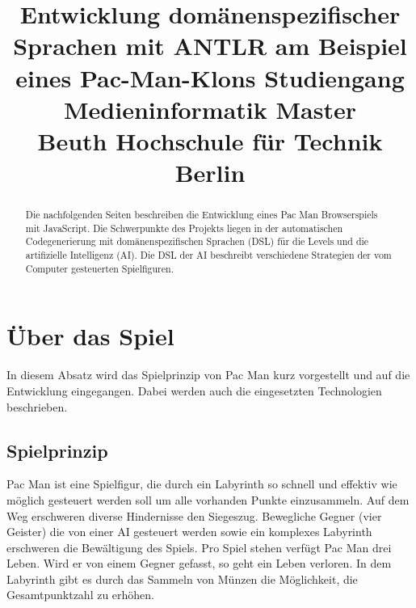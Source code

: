 \documentclass[conference]{IEEEtran}
\begin{document}
\title{%
  Entwicklung domänenspezifischer Sprachen mit ANTLR am Beispiel eines Pac-Man-Klons\bigbreak
  \large Studiengang Medieninformatik Master\\Beuth Hochschule für Technik Berlin}


\author{
\and
{}
\and
{}
}

\maketitle

\lstset{%
  basicstyle=\footnotesize\ttfamily
  }
\begin{abstract}
Die nachfolgenden Seiten beschreiben die Entwicklung eines Pac Man Browserspiels mit JavaScript. Die Schwerpunkte des Projekts liegen in der automatischen Codegenerierung mit domänenspezifischen Sprachen (DSL) für die Levels und die artifizielle Intelligenz (AI). Die DSL der AI beschreibt verschiedene Strategien der vom  Computer gesteuerten Spielfiguren.
\end{abstract}

\IEEEpeerreviewmaketitle



\section{Über das Spiel}

In diesem Absatz wird das Spielprinzip von Pac Man kurz vorgestellt und auf die Entwicklung eingegangen. Dabei werden auch die eingesetzten Technologien beschrieben.

\subsection{Spielprinzip}
Pac Man ist eine Spielfigur, die durch ein Labyrinth so schnell und effektiv wie möglich gesteuert werden soll um alle vorhanden Punkte einzusammeln. Auf dem Weg erschweren diverse Hindernisse den Siegeszug. Bewegliche Gegner (vier Geister) die von einer AI gesteuert werden sowie ein komplexes Labyrinth erschweren die Bewältigung des Spiels. Pro Spiel stehen verfügt Pac Man drei Leben. Wird er von einem Gegner gefasst, so geht ein Leben verloren. In dem Labyrinth gibt es durch das Sammeln von Münzen die Möglichkeit, die Gesamtpunktzahl zu erhöhen.
\end{document}
